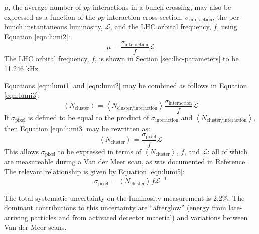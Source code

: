 $\mu$, the average number of $pp$ interactions in a bunch crossing, may also be expressed
as a function of the $pp$ interaction cross section, $\sigma_{\text{interaction}}$, the per-bunch
instantaneous luminosity, $\mathcal{L}$, and the LHC orbital frequency, $f$, using Equation \ref{eqn:lumi2}:
\begin{equation}
  \mu = \frac{\sigma_{\text{interaction}}}{f}\mathcal{L}
  \label{eqn:lumi2}
\end{equation}
The LHC orbital frequency, $f$, is shown in Section \ref{sec:lhc-parameters} to be 11.246 kHz.

Equations \ref{eqn:lumi1} and \ref{eqn:lumi2} may be combined as follows in Equation \ref{eqn:lumi3}:
\begin{equation}
  \left<N_{\text{cluster}}\right> = \left<N_{\text{cluster/interaction}}\right> \frac{\sigma_{\text{interaction}}}{f}\mathcal{L}
  \label{eqn:lumi3}
\end{equation}
If $\sigma_{\text{pixel}}$ is defined to be equal to the product of 
$\sigma_{\text{interaction}}$ and $\left<N_{\text{cluster/interaction}}\right>$,
then Equation \ref{eqn:lumi3} may be rewritten as:
\begin{equation}
  \left<N_{\text{cluster}}\right> = \frac{\sigma_{\text{pixel}}}{f}\mathcal{L}
  \label{eqn:lumi4}
\end{equation}
This allows $\sigma_{\text{pixel}}$ to be expressed in terms of 
$\left<N_{\text{cluster}}\right>$, $f$, and $\mathcal{L}$: all of which
are measureable during a Van der Meer scan, as was documented in Reference \cite{cms-lumi-uncertainty}.
The relevant relationship is given by Equation \ref{eqn:lumi5}:
\begin{equation}
  \sigma_{\text{pixel}} = \left<N_{\text{cluster}}\right> f \mathcal{L}^{-1}
  \label{eqn:lumi5}
\end{equation}

The total systematic uncertainty on the luminosity measurement is 2.2\%.
The dominant contributions to this uncertainty are ``afterglow'' (energy
from late-arriving particles and from activated detector material)
and variations between Van der Meer scans.
